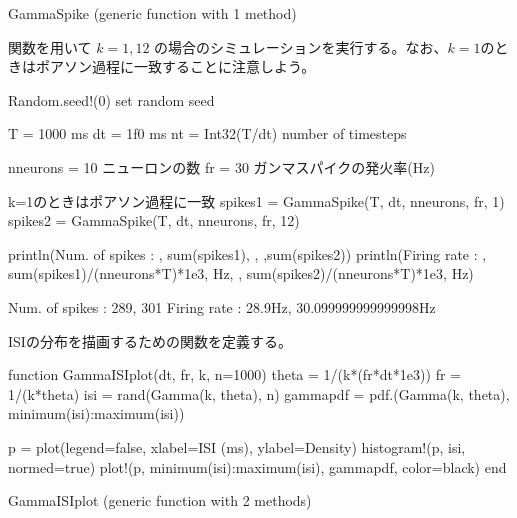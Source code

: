 \documentclass[letterpaper,10pt,english]{sphinxmanual}
\begin{document}
\begin{sphinxVerbatim}[commandchars=\\\{\}]
GammaSpike (generic function with 1 method)
\end{sphinxVerbatim}

 関数を用いて \(k=1, 12\) の場合のシミュレーションを実行する。なお、\(k=1\)のときはポアソン過程に一致することに注意しよう。

\begin{sphinxVerbatim}[commandchars=\\\{\}]
Random.seed!(0) \PYGZsh{} set random seed

T = 1000 \PYGZsh{} ms
dt = 1f0 \PYGZsh{} ms
nt = Int32(T/dt) \PYGZsh{} number of timesteps

n\PYGZus{}neurons = 10 \PYGZsh{} ニューロンの数
fr = 30 \PYGZsh{} ガンマスパイクの発火率(Hz)

\PYGZsh{} k=1のときはポアソン過程に一致
spikes1 = GammaSpike(T, dt, n\PYGZus{}neurons, fr, 1)
spikes2 = GammaSpike(T, dt, n\PYGZus{}neurons, fr, 12)

println(\PYGZdq{}Num. of spikes : \PYGZdq{}, sum(spikes1), \PYGZdq{}, \PYGZdq{},sum(spikes2))
println(\PYGZdq{}Firing rate : \PYGZdq{}, sum(spikes1)/(n\PYGZus{}neurons*T)*1e3, \PYGZdq{}Hz, \PYGZdq{}, sum(spikes2)/(n\PYGZus{}neurons*T)*1e3, \PYGZdq{}Hz\PYGZdq{})
\end{sphinxVerbatim}

\begin{sphinxVerbatim}[commandchars=\\\{\}]
Num. of spikes : 289, 301
Firing rate : 28.9Hz, 30.099999999999998Hz
\end{sphinxVerbatim}

ISIの分布を描画するための関数を定義する。

\begin{sphinxVerbatim}[commandchars=\\\{\}]
function GammaISIplot(dt, fr, k, n=1000)
    theta = 1/(k*(fr*dt*1e\PYGZhy{}3)) \PYGZsh{} fr = 1/(k*theta)
    isi = rand(Gamma(k, theta), n)
    gamma\PYGZus{}pdf = pdf.(Gamma(k, theta), minimum(isi):maximum(isi))

    p = plot(legend=false, xlabel=\PYGZdq{}ISI (ms)\PYGZdq{}, ylabel=\PYGZdq{}Density\PYGZdq{})
    histogram!(p, isi, normed=true)
    plot!(p, minimum(isi):maximum(isi), gamma\PYGZus{}pdf, color=\PYGZdq{}black\PYGZdq{})
end
\end{sphinxVerbatim}

\begin{sphinxVerbatim}[commandchars=\\\{\}]
GammaISIplot (generic function with 2 methods)
\end{sphinxVerbatim}
\end{document}

